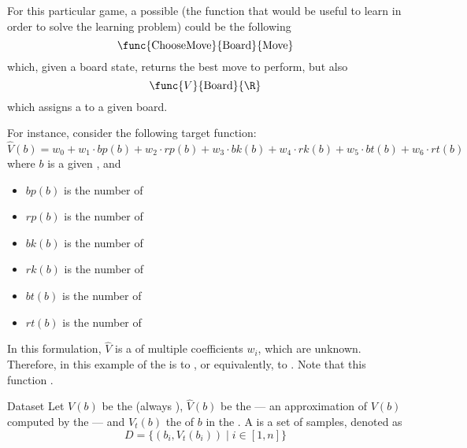 \documentclass[a4paper, 12pt]{report}
\begin{document}
    For this particular game, a possible  (the function that would be useful to learn in order to solve the learning problem) could be the following $$\func{\mathrm{ChooseMove}}{\mathrm{Board}}{\mathrm{Move}}$$ which, given a board state, returns the best move to perform, but also $$\func{V}{\mathrm{Board}}{\R}$$ which assigns a  to a given board.

    For instance, consider the following target function: $$\hat V(b) = w_0 + w_1 \cdot bp(b) + w_2 \cdot rp(b) + w_3 \cdot bk(b) + w_4 \cdot rk(b) + w_5 \cdot bt(b) + w_6 \cdot rt(b)$$ where $b$ is a given , and

    \begin{itemize}
        \item $bp(b)$ is the number of 
        \item $rp(b)$ is the number of 
        \item $bk(b)$ is the number of 
        \item $rk(b)$ is the number of 
        \item $bt(b)$ is the number of 
        \item $rt(b)$ is the number of 
    \end{itemize}

    In this formulation, $\hat V$ is a  of multiple coefficients $w_i$, which are unknown. Therefore, in this example  of the  is to , or equivalently, to . Note that this function .
    
    \begin{frameddefn}{Dataset}
        Let $V(b)$ be the  (always ), $\hat V(b)$ be the  --- an approximation of $V(b)$ computed by the  --- and $V_t(b)$ the  of $b$ in the . A  is a set of samples, denoted as $$D = \{(b_i, V_t(b_i)) \mid i \in [1, n]\}$$
    \end{frameddefn}
\end{document}
